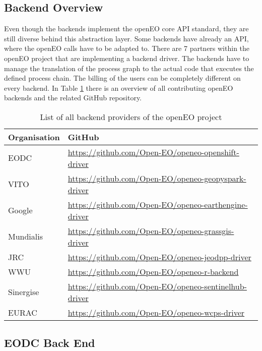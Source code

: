 \documentclass[draft,final]{vutinfth} %
\begin{document}
\subsection{Backend Overview}\label{Backend Overview}
Even though the backends implement the openEO core API standard, they are still diverse behind this abstraction layer. Some backends have already an API, where the openEO calls have to be adapted to. There are 7 partners within the openEO project that are implementing a backend driver. The backends have to manage the translation of the process graph to the actual code that executes the defined process chain. The billing of the users can be completely different on every backend. In Table \ref{Tab:backends} there is an overview of all contributing openEO backends and the related GitHub repository. 
\begin{table}[]
	\caption{List of all backend providers of the openEO project}
	\begin{tabular}{l|l}
		\textbf{Organisation} & \textbf{GitHub}  \\ \hline
		EODC & \url{https://github.com/Open-EO/openeo-openshift-driver} \\ \hline 
		VITO & \url{https://github.com/Open-EO/openeo-geopyspark-driver} \\ \hline  
		Google  & \url{https://github.com/Open-EO/openeo-earthengine-driver} \\ \hline  
		Mundialis & \url{https://github.com/Open-EO/openeo-grassgis-driver} \\ \hline 
		JRC & \url{https://github.com/Open-EO/openeo-jeodpp-driver} \\ \hline
		WWU & \url{https://github.com/Open-EO/openeo-r-backend} \\ \hline
		Sinergise & \url{https://github.com/Open-EO/openeo-sentinelhub-driver} \\ \hline
		EURAC & \url{https://github.com/Open-EO/openeo-wcps-driver} \\ 
	\end{tabular}
	\label{Tab:backends}
\end{table}

\subsection{EODC Back End}\label{EODC Back End}
\end{document}
